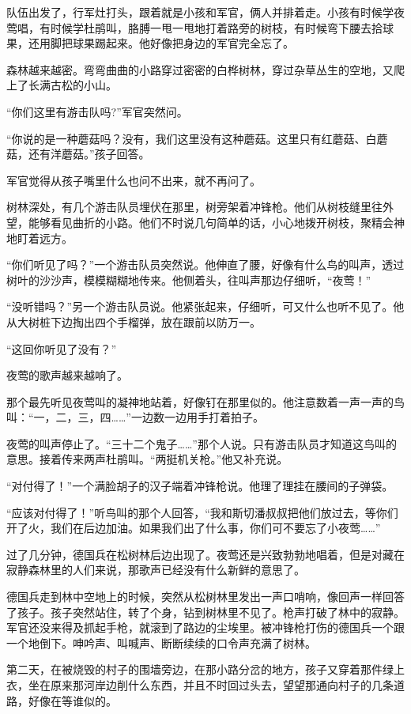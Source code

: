 \documentclass[12pt,UTF8]{ctexbook}
\begin{document}
队伍出发了，行军灶打头，跟着就是小孩和军官，俩人并排着走。小孩有时候学夜莺唱，有时候学杜鹃叫，胳膊一甩一甩地打着路旁的树枝，有时候弯下腰去拾球果，还用脚把球果踢起来。他好像把身边的军官完全忘了。

森林越来越密。弯弯曲曲的小路穿过密密的白桦树林，穿过杂草丛生的空地，又爬上了长满古松的小山。

“你们这里有游击队吗?”军官突然问。

“你说的是一种蘑菇吗？没有，我们这里没有这种蘑菇。这里只有红蘑菇、白蘑菇，还有洋蘑菇。”孩子回答。

军官觉得从孩子嘴里什么也问不出来，就不再问了。

树林深处，有几个游击队员埋伏在那里，树旁架着冲锋枪。他们从树枝缝里往外望，能够看见曲折的小路。他们不时说几句简单的话，小心地拨开树枝，聚精会神地盯着远方。

“你们听见了吗？”一个游击队员突然说。他伸直了腰，好像有什么鸟的叫声，透过树叶的沙沙声，模模糊糊地传来。他侧着头，往叫声那边仔细听，“夜莺！”

“没听错吗？”另一个游击队员说。他紧张起来，仔细听，可又什么也听不见了。他从大树桩下边掏出四个手榴弹，放在跟前以防万一。

“这回你听见了没有？”

夜莺的歌声越来越响了。

那个最先听见夜莺叫的凝神地站着，好像钉在那里似的。他注意数着一声一声的鸟叫：“一，二，三，四……”一边数一边用手打着拍子。

夜莺的叫声停止了。“三十二个鬼子……”那个人说。只有游击队员才知道这鸟叫的意思。接着传来两声杜鹃叫。“两挺机关枪。”他又补充说。

“对付得了！”一个满脸胡子的汉子端着冲锋枪说。他理了理挂在腰间的子弹袋。

“应该对付得了！”听鸟叫的那个人回答，“我和斯切潘叔叔把他们放过去，等你们开了火，我们在后边加油。如果我们出了什么事，你们可不要忘了小夜莺……”

过了几分钟，德国兵在松树林后边出现了。夜莺还是兴致勃勃地唱着，但是对藏在寂静森林里的人们来说，那歌声已经没有什么新鲜的意思了。

德国兵走到林中空地上的时候，突然从松树林里发出一声口哨响，像回声一样回答了孩子。孩子突然站住，转了个身，钻到树林里不见了。枪声打破了林中的寂静。军官还没来得及抓起手枪，就滚到了路边的尘埃里。被冲锋枪打伤的德国兵一个跟一个地倒下。呻吟声、叫喊声、断断续续的口令声充满了树林。

第二天，在被烧毁的村子的围墙旁边，在那小路分岔的地方，孩子又穿着那件绿上衣，坐在原来那河岸边削什么东西，并且不时回过头去，望望那通向村子的几条道路，好像在等谁似的。
\end{document}
